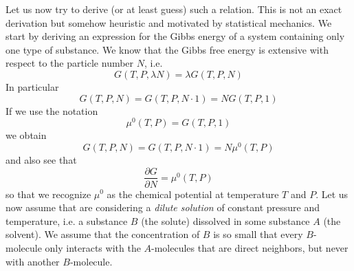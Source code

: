 \documentclass[a4paper, draft]{report}
\numberwithin{section}{chapter}
\numberwithin{equation}{chapter}
\theoremstyle{own}
\theoremstyle{remark}
\begin{document}
Let us now try to derive (or at least guess) such a relation. This is not an exact derivation but somehow heuristic and motivated by statistical mechanics. We start by deriving an expression for the Gibbs energy of a system containing only one type of substance. We know that the Gibbs free energy is extensive with respect to the particle number $N$, i.e. 
$$
G(T, P, \lambda N) = \lambda G(T, P, N)
$$
In particular
$$
G(T, P, N) = G(T, P, N \cdot 1) = N G(T, P, 1)
$$
If we use the notation
$$
\mu^0 (T, P) = G(T, P, 1)
$$
we obtain
$$
G(T, P, N) = G(T, P, N \cdot 1) = N \mu^0 (T, P)
$$
and also see that 
$$
\frac{\partial G}{ \partial N} = \mu^0 (T, P)
$$
so that we recognize $\mu^0$ as the chemical potential at temperature $T$ and $P$. Let us now assume that are considering a {\em dilute solution} of constant pressure and temperature, i.e. a substance $B$ (the solute) dissolved in some substance $A$ (the solvent). We assume that the concentration of $B$ is so small that every $B$-molecule only interacts with the $A$-molecules that are direct neighbors, but never with another $B$-molecule. 
\end{document}
